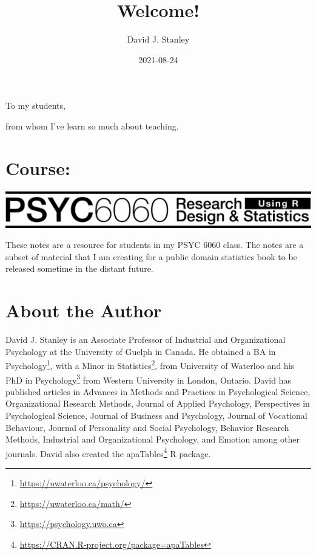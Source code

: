 \documentclass[
]{krantz}
\title{Welcome!}
\author{David J. Stanley}
\date{2021-08-24}
\renewcommand{\href}[2]{#2\footnote{\url{#1}}}
\begin{document}
\maketitle


\thispagestyle{empty}

\begin{center}
To my students,

from whom I've learn so much about teaching.
\end{center}

\setlength{\abovedisplayskip}{-5pt}
\setlength{\abovedisplayshortskip}{-5pt}

{
\hypersetup{linkcolor=}
\setcounter{tocdepth}{2}
\tableofcontents
}
\listoftables
\listoffigures
\hypertarget{course}{%
\chapter*{Course:}\label{course}}


\includegraphics[width=1\linewidth]{header_6060}

These notes are a resource for students in my PSYC 6060 class. The notes are a subset of material that I am creating for a public domain statistics book to be released sometime in the distant future.

\hypertarget{about-the-author}{%
\chapter*{About the Author}\label{about-the-author}}


David J. Stanley is an Associate Professor of Industrial and Organizational Psychology at the University of Guelph in Canada. He obtained a BA in \href{https://uwaterloo.ca/psychology/}{Psychology}, with a Minor in \href{https://uwaterloo.ca/math/}{Statistics}, from University of Waterloo and his PhD in \href{https://psychology.uwo.ca}{Psychology} from Western University in London, Ontario. David has published articles in Advances in Methods and Practices in Psychological Science, Organizational Research Methods, Journal of Applied Psychology, Perspectives in Psychological Science, Journal of Business and Psychology, Journal of Vocational Behaviour, Journal of Personality and Social Psychology, Behavior Research Methods, Industrial and Organizational Psychology, and Emotion among other journals. David also created the \href{https://CRAN.R-project.org/package=apaTables}{apaTables} R package.
\end{document}
